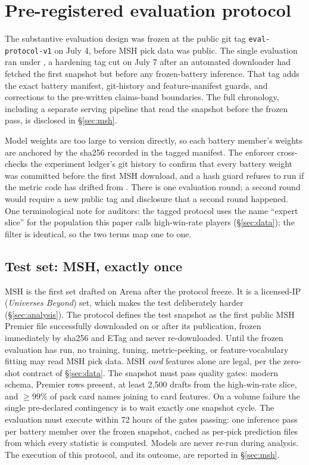 \section{Pre-registered evaluation protocol}
\label{sec:protocol}

The substantive evaluation design was frozen at the public git tag
\texttt{eval-protocol-v1} on July 4, before MSH pick data was public. The
single evaluation ran under \texttt{\ProtocolTag}, a hardening tag cut on
July 7 after an automated downloader had fetched the first snapshot but
before any frozen-battery inference. That tag adds the exact battery
manifest, git-history and feature-manifest guards, and corrections to the
pre-written claims-band boundaries. The full chronology, including a
separate serving pipeline that read the snapshot before the frozen pass,
is disclosed in \S\ref{sec:msh}.

Model weights are too large to version directly, so each battery member's
weights are anchored by the sha256 recorded in the tagged manifest. The
enforcer cross-checks the experiment ledger's git history to confirm that
every battery weight was committed before the first MSH download, and a
hash guard refuses to run if the metric code has drifted from
\texttt{\ProtocolTag}. There is one evaluation round; a second round would
require a new public tag and disclosure that a second round happened. One
terminological note for auditors: the tagged protocol uses the name
``expert slice'' for the population this paper calls high-win-rate players
(\S\ref{sec:data}); the filter is identical, so the two terms map one to
one.

\subsection{Test set: MSH, exactly once}

MSH is the first \mtg{} set drafted on Arena after the protocol freeze. It
is a licensed-IP (\emph{Universes Beyond}) set, which makes the test
deliberately harder (\S\ref{sec:analysis}). The protocol defines the test
snapshot as the first public \seventeenlands{} MSH Premier file
successfully downloaded on or after its publication, frozen immediately by
sha256 and ETag and never re-downloaded. Until the frozen evaluation has
run, no training, tuning, metric-peeking, or feature-vocabulary fitting
may read MSH pick data. MSH \emph{card} features alone are legal, per the
zero-shot contract of \S\ref{sec:data}. The snapshot must pass quality
gates: modern schema, Premier rows present, at least 2{,}500 drafts from
the high-win-rate slice, and $\geq 99\%$ of pack card names joining to
card features. On a volume failure the single pre-declared contingency is
to wait exactly one snapshot cycle. The evaluation must execute within 72
hours of the gates passing: one inference pass per battery member over the
frozen snapshot, cached as per-pick prediction files from which every
statistic is computed. Models are never re-run during analysis. The
execution of this protocol, and its outcome, are reported in
\S\ref{sec:msh}.

